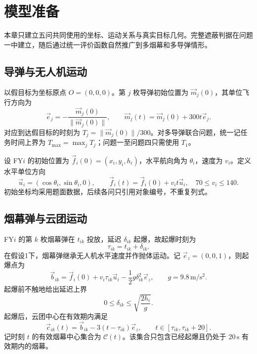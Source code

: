 \section{模型准备}

本章只建立五问共同使用的坐标、运动关系与真实目标几何。完整遮蔽判据在问题一中建立，随后通过统一评价函数自然推广到多烟幕和多导弹情形。

\subsection{导弹与无人机运动}
以假目标为坐标原点 $O=(0,0,0)$。第 $j$ 枚导弹初始位置为 $\vec m_j(0)$，其单位飞行方向为
\begin{equation}
\vec e_j=-\frac{\vec m_j(0)}{\lVert\vec m_j(0)\rVert},
\qquad
\vec m_j(t)=\vec m_j(0)+300t\vec e_j.
\label{eq:missile}
\end{equation}
对应到达假目标的时刻为 $T_j=\lVert\vec m_j(0)\rVert/300$。对多导弹联合问题，统一记任务时间上界为 $T_{\max}=\max_j T_j$；问题一至问题四只需使用 $T_1$。

设 FY$i$ 的初始位置为 $\vec f_i(0)=(x_i,y_i,h_i)$，水平航向角为 $\theta_i$，速度为 $v_i$。定义水平单位方向
\begin{equation}
\vec u_i=(\cos\theta_i,\sin\theta_i,0),
\qquad
\vec f_i(t)=\vec f_i(0)+v_it\vec u_i,
\quad 70\le v_i\le140.
\label{eq:uav}
\end{equation}
初始坐标均采用题面数据，后续各问只引用对象编号，不重复列式。

\subsection{烟幕弹与云团运动}
FY$i$ 的第 $k$ 枚烟幕弹在 $t_{ik}$ 投放，延迟 $\delta_{ik}$ 起爆，故起爆时刻为
\begin{equation}
\tau_{ik}=t_{ik}+\delta_{ik}.
\label{eq:burst-time}
\end{equation}
在假设1下，烟幕弹继承无人机水平速度并作抛体运动。记 $\vec e_z=(0,0,1)$，则起爆点为
\begin{equation}
\vec b_{ik}=\vec f_i(0)+v_i\tau_{ik}\vec u_i
-\frac12g\delta_{ik}^{2}\vec e_z,
\qquad g=9.8\,\mathrm{m/s^2}.
\label{eq:burst-point}
\end{equation}
起爆前不触地给出延迟上界
\begin{equation}
0\le\delta_{ik}\le\sqrt{\frac{2h_i}{g}}.
\label{eq:delay-cap}
\end{equation}
起爆后，云团中心在有效期内满足
\begin{equation}
\vec c_{ik}(t)=\vec b_{ik}-3(t-\tau_{ik})\vec e_z,
\qquad t\in[\tau_{ik},\tau_{ik}+20].
\label{eq:cloud}
\end{equation}
记时刻 $t$ 的有效烟幕中心集合为 $\mathcal C(t)$。该集合只包含已经起爆且仍处于 $20\,\mathrm s$ 有效期内的烟幕。

